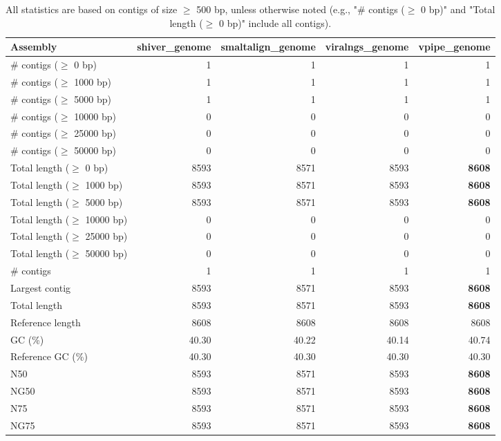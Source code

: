 \documentclass[12pt,a4paper]{article}
\begin{document}
\begin{table}[ht]
\begin{center}
\caption{All statistics are based on contigs of size $\geq$ 500 bp, unless otherwise noted (e.g., "\# contigs ($\geq$ 0 bp)" and "Total length ($\geq$ 0 bp)" include all contigs).}
\begin{tabular}{|l*{4}{|r}|}
\hline
Assembly & shiver\_genome & smaltalign\_genome & viralngs\_genome & vpipe\_genome \\ \hline
\# contigs ($\geq$ 0 bp) & 1 & 1 & 1 & 1 \\ \hline
\# contigs ($\geq$ 1000 bp) & 1 & 1 & 1 & 1 \\ \hline
\# contigs ($\geq$ 5000 bp) & 1 & 1 & 1 & 1 \\ \hline
\# contigs ($\geq$ 10000 bp) & 0 & 0 & 0 & 0 \\ \hline
\# contigs ($\geq$ 25000 bp) & 0 & 0 & 0 & 0 \\ \hline
\# contigs ($\geq$ 50000 bp) & 0 & 0 & 0 & 0 \\ \hline
Total length ($\geq$ 0 bp) & 8593 & 8571 & 8593 & {\bf 8608} \\ \hline
Total length ($\geq$ 1000 bp) & 8593 & 8571 & 8593 & {\bf 8608} \\ \hline
Total length ($\geq$ 5000 bp) & 8593 & 8571 & 8593 & {\bf 8608} \\ \hline
Total length ($\geq$ 10000 bp) & 0 & 0 & 0 & 0 \\ \hline
Total length ($\geq$ 25000 bp) & 0 & 0 & 0 & 0 \\ \hline
Total length ($\geq$ 50000 bp) & 0 & 0 & 0 & 0 \\ \hline
\# contigs & 1 & 1 & 1 & 1 \\ \hline
Largest contig & 8593 & 8571 & 8593 & {\bf 8608} \\ \hline
Total length & 8593 & 8571 & 8593 & {\bf 8608} \\ \hline
Reference length & 8608 & 8608 & 8608 & 8608 \\ \hline
GC (\%) & 40.30 & 40.22 & 40.14 & 40.74 \\ \hline
Reference GC (\%) & 40.30 & 40.30 & 40.30 & 40.30 \\ \hline
N50 & 8593 & 8571 & 8593 & {\bf 8608} \\ \hline
NG50 & 8593 & 8571 & 8593 & {\bf 8608} \\ \hline
N75 & 8593 & 8571 & 8593 & {\bf 8608} \\ \hline
NG75 & 8593 & 8571 & 8593 & {\bf 8608} \\ \hline

\end{tabular}
\end{center}
\end{table}
\end{document}
